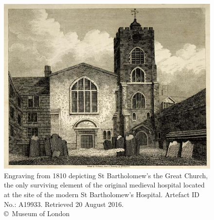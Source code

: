 \documentclass[%
	]{ijsra}
\begin{document}
	\begin{figure}
		\includegraphics[width=\linewidth]{figures/Pereda-Figure02}
		\caption{Engraving from 1810 depicting St Bartholomew’s the Great Church, the only surviving element of the original medieval hospital located at the site of the modern St Bartholomew’s Hospital. Artefact ID No.: A19933. Retrieved 20 August 2016.
		{\normalfont\scriptsize \\ \copyright\ Museum of London}}
		\label{fig:Pereda-Figure02}
	\end{figure}
\end{document}
